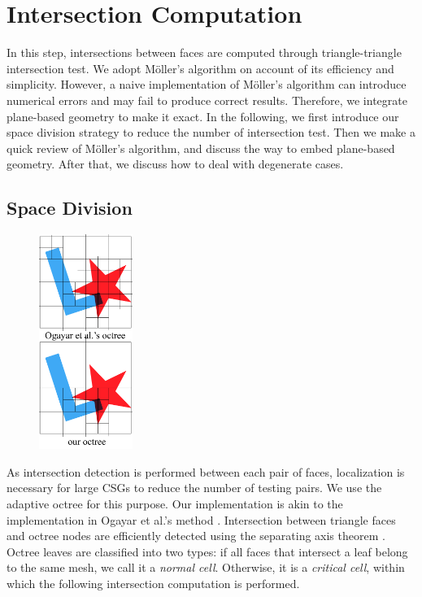 \documentclass[10pt,journal,compsoc]{IEEEtran}
\begin{document}
\section{Intersection Computation}

\label{section:isect}
In this step, intersections between faces are computed through triangle-triangle intersection test. We adopt M\"{o}ller's algorithm \cite{moller1997fast} on account of its efficiency and simplicity. However, a naive implementation of M\"{o}ller's algorithm can introduce numerical errors and may fail to produce correct results. Therefore, we integrate plane-based geometry to make it exact. In the following, we first introduce our space division strategy to reduce the number of intersection test. Then we make a quick review of M\"{o}ller's algorithm, and discuss the way to embed plane-based geometry. After that, we discuss how to deal with degenerate cases.



\subsection{Space Division}
\begin{figure}
\includegraphics[width=1.2in]{octreediff}
\end{figure}
As intersection detection is performed between each pair of faces, localization is necessary for large CSGs to reduce the number of testing pairs. We use the adaptive octree for this purpose. Our implementation is akin to the implementation in Ogayar et al.'s method \cite{ogayar2015deferred}. Intersection between triangle faces and octree nodes are efficiently detected using the separating axis theorem \cite{gottschalk1996obbtree}. Octree leaves are classified into two types: if all faces that intersect a leaf belong to the same mesh, we call it a \emph{normal cell}. Otherwise, it is a \emph{critical cell}, within which the following intersection computation is performed.
\end{document}
